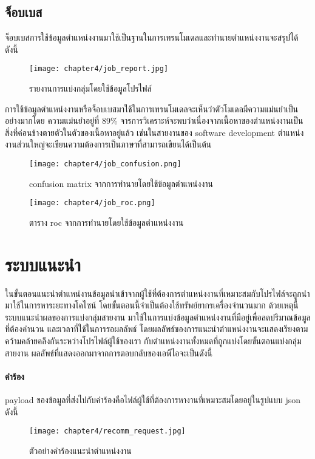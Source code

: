 \subsection{จ็อบเบส}
จ็อบเบสการใช้ข้อมูลตำแหน่งงานมาใช้เป็นฐานในการเทรนโมเดลและทำนายตำแหน่งงานจะสรุปได้ดังนี้

\begin{figure}[!h]
  \centering
  \texttt{[image: chapter4/job\_report.jpg]}
  \caption{รายงานการแบ่งกลุ่มโดยใช้ข้อมูลโปรไฟล์}
  \label{Fig:result-profile-group}
\end{figure}
การใช้ข้อมูลตำแหน่งงานหรือจ็อบเบสมาใช้ในการเทรนโมเดลจะเห็นว่าตัวโมเดลมีความแม่นยำเป็นอย่างมากโดย ความแม่นยำอยู่ที่ 89\% จารการวิเคราะห์จะพบว่าเนื่องจากเนื้อหาของตำแหน่งงานเป็นสิ่งที่ค่อนข้างตายตัวในตัวของเนื้อหาอยู่แล้ว เช่นในสายงานของ software development ตำแหน่งงานส่วนใหญ่จะเขียนความต้องการเป็นภาษาที่สามารถเขียนได้เป็นต้น

\begin{figure}[!h]
  \centering
  \texttt{[image: chapter4/job\_confusion.png]}  
  \caption{confusion matrix จากการทำนายโดยใช้ข้อมูลตำแหน่งงาน}
  \label{Fig:result-profile-group}
\end{figure}
\begin{figure}[!h]
  \centering
  \texttt{[image: chapter4/job\_roc.png]}  
  \caption{ตาราง roc จากการทำนายโดยใช้ข้อมูลตำแหน่งงาน}
  \label{Fig:result-profile-group}
\end{figure}
\clearpage

\newpage
\section{ระบบแนะนำ}
ในขั้นตอนแนะนำตำแหน่งานข้อมูลนำเข้าจากผู้ใช้ที่ต้องการตำแหน่งงานที่เหมาะสมกับโปรไฟล์จะถูกนำมาใช้ในการหาระยะทางโคไซน์ โดยขั้นตอนนี้จำเป็นต้องใช้ทรัพย์ยากรเครื่องจำนวนมาก ด้วยเหตุนี้ระบบแนะนำผลของการแบ่งกลุ่มสายงาน มาใช้ในการแบ่งข้อมูลตำแหน่งงานที่มีอยู่เพื่อลดปริมาณข้อมูลที่ต้องคำนวน และเวลาที่ใช้ในการรอผลลัพธ์ \newline
โดยผลลัพธ์ของการแนะนำตำแหน่งงานจะแสดงเรียงตามคว้ามคล้ายคลึงกันระหว่างโปรไฟล์ผู้ใช้ของเรา กับตำแหน่งงานทั้งหมดที่ถูกแบ่งโดยขั้นตอนแบ่งกลุ่มสายงาน ผลลัพธ์ที่แสดงออกมาจากการตอบกลับของเอพีไอจะเป็นดังนี้

\paragraph*{คำร้อง}
  payload ของข้อมูลที่ส่งไปกับคำร้องคือไฟล์ผู้ใช้ที่ต้องการหางานที่เหมาะสมโดยอยู่ในรูปแบบ json ดังนี้
  \begin{figure}[!h]
    \centering
    \texttt{[image: chapter4/recomm\_request.jpg]}  
    \caption{ตัวอย่างคำร้องแนะนำตำแหน่งงาน}
    \label{Fig:recomm_request}
  \end{figure}
  \clearpage

